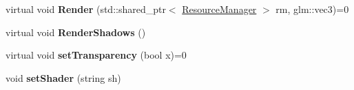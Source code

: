 \begin{DoxyCompactItemize}
\item 
virtual void {\bfseries Render} (std\+::shared\+\_\+ptr$<$ \hyperlink{class_resource_manager}{Resource\+Manager} $>$ rm, glm\+::vec3)=0\hypertarget{class_component_1_1_component_ac485b3a9afb2f9dd593fa6b7714ad3cc}{}\label{class_component_1_1_component_ac485b3a9afb2f9dd593fa6b7714ad3cc}

\item 
virtual void {\bfseries Render\+Shadows} ()\hypertarget{class_component_1_1_component_a99c7072041c25a077cf4633669c1c984}{}\label{class_component_1_1_component_a99c7072041c25a077cf4633669c1c984}

\item 
virtual void {\bfseries set\+Transparency} (bool x)=0\hypertarget{class_component_1_1_component_af43987e6d8dadab7ef7aaee6629fa1e1}{}\label{class_component_1_1_component_af43987e6d8dadab7ef7aaee6629fa1e1}

\item 
void {\bfseries set\+Shader} (string sh)\hypertarget{class_component_1_1_component_a6a113766820370bb4cdc4129d2408a55}{}\label{class_component_1_1_component_a6a113766820370bb4cdc4129d2408a55}

\end{DoxyCompactItemize}
